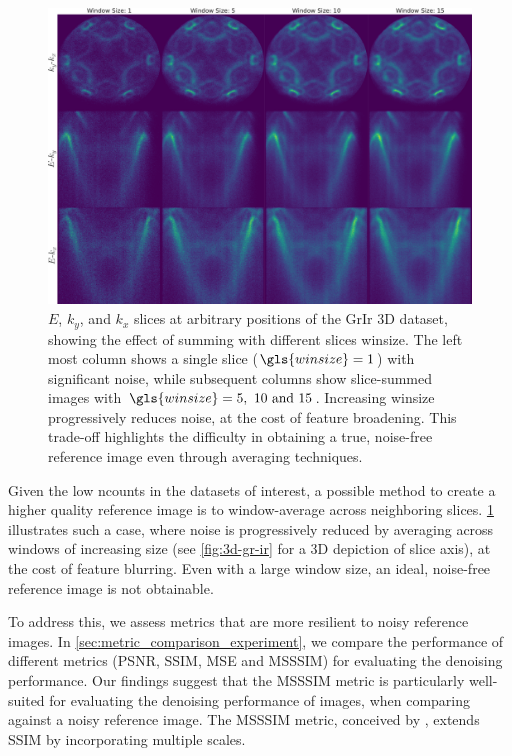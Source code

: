 \begin{figure}
    \centering
    \includegraphics[width=1\linewidth]{images/slices.pdf}
    \caption{$E$, $k_y$, and $k_x$ slices at arbitrary positions of the \gls{GrIr} 3D dataset, showing the effect of summing with different  slices \gls{winsize}. The left most column shows a single slice ($\gls{winsize}=1$) with significant noise, while subsequent columns show slice-summed images with $\gls{winsize}=\numlist{5;10;15}$. Increasing \gls{winsize} progressively reduces noise, at the cost of feature broadening. This trade-off highlights the difficulty in obtaining a true, noise-free reference image even through averaging techniques.}
    \label{fig:slices}
\end{figure}

Given the low \gls{ncounts} in the datasets of interest, a possible method to create a higher quality reference image is to window-average across neighboring slices. \cref{fig:slices} illustrates such a case, where noise is progressively reduced by averaging across windows of increasing size (see \cref{fig:3d-gr-ir} for a 3D depiction of slice axis), at the cost of feature blurring. Even with a large window size, an ideal, noise-free reference image is not obtainable.

To address this, we assess metrics that are more resilient to noisy reference images. In \cref{sec:metric_comparison_experiment}, we compare the performance of different metrics (\gls{PSNR}, \gls{SSIM}, \gls{MSE} and \gls{MSSSIM}) for evaluating the denoising performance. Our findings suggest that the \gls{MSSSIM} metric is particularly well-suited for evaluating the denoising performance of images, when comparing against a noisy reference image. The \gls{MSSSIM} metric, conceived by \citeauthor{wangMultiscaleStructuralSimilarity2003} \cite{wangMultiscaleStructuralSimilarity2003}, extends SSIM by incorporating multiple scales. 

